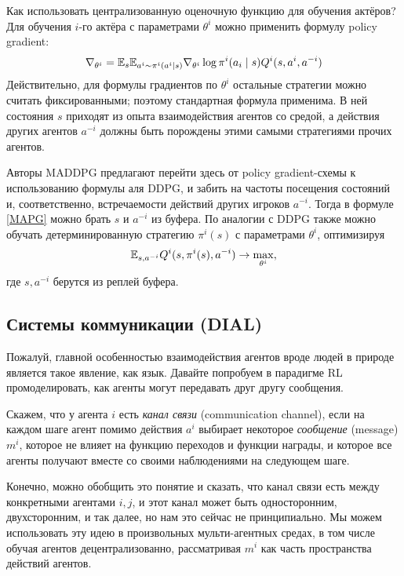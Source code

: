 Как использовать централизованную оценочную функцию для обучения актёров? Для обучения $i$-го актёра с параметрами $\theta^i$ можно применить формулу policy gradient:
\begin{equation}\label{MAPG}
\nabla_{\theta^i} = \E_{s} \E_{a^i \sim \pi^i(a^i \mid s)} \nabla_{\theta^i} \log \pi^i(a_i \HM\mid s) Q^i(s, a^i, a^{-i})
\end{equation}
Действительно, для формулы градиентов по $\theta^i$ остальные стратегии можно считать фиксированными; поэтому стандартная формула применима. В ней состояния $s$ приходят из опыта взаимодействия агентов со средой, а действия других агентов $a^{-i}$ должны быть порождены этими самыми стратегиями прочих агентов. 

Авторы MADDPG предлагают перейти здесь от policy gradient-схемы к использованию формулы аля DDPG, и забить на частоты посещения состояний и, соответственно, встречаемости действий других игроков $a^{-i}$. Тогда в формуле \eqref{MAPG} можно брать $s$ и $a^{-i}$ из буфера. По аналогии с DDPG также можно обучать детерминированную стратегию $\pi^i(s)$ с параметрами $\theta^i$, оптимизируя
$$\mathbb{E}_{s, a^{-i}} Q^i(s, \pi^i(s), a^{-i}) \to \max_{\theta^i},$$
где $s, a^{-i}$ берутся из реплей буфера.

\subsection{Системы коммуникации (DIAL)}

Пожалуй, главной особенностью взаимодействия агентов вроде людей в природе является такое явление, как язык. Давайте попробуем в парадигме RL промоделировать, как агенты могут передавать друг другу сообщения.

\begin{definition}
Скажем, что у агента $i$ есть \emph{канал связи} (communication channel), если на каждом шаге агент помимо действия $a^i$ выбирает некоторое \emph{сообщение} (message) $m^i$, которое не влияет на функцию переходов и функции награды, и которое все агенты получают вместе со своими наблюдениями на следующем шаге.
\end{definition}

Конечно, можно обобщить это понятие и сказать, что канал связи есть между конкретными агентами $i, j$, и этот канал может быть односторонним, двухсторонним, и так далее, но нам это сейчас не принципиально. Мы можем использовать эту идею в произвольных мульти-агентных средах, в том числе обучая агентов децентрализованно, рассматривая $m^i$ как часть пространства действий агентов.


